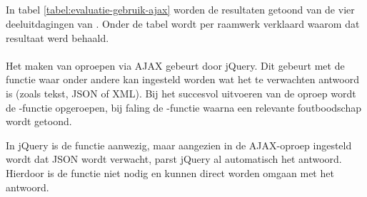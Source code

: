 
\subsection{}
\label{sec:evaluatie-gebruik-ajax}

In tabel \ref{tabel:evaluatie-gebruik-ajax} worden de resultaten getoond van de vier deeluitdagingen van .
Onder de tabel wordt per raamwerk verklaard waarom dat resultaat werd behaald.

\begin{table}[H]
\centering
{}
\caption{Gebruik van  voor \st{}~(\sta), \kendo{}~(\kendoa), \jqm{}~(\jqma) en \lungo{}~(\lungoa).}
\label{tabel:evaluatie-gebruik-ajax}
\end{table}


\paragraph{\jqm}
Het maken van oproepen via AJAX gebeurt door jQuery. 
Dit gebeurt met de functie  waar onder andere kan ingesteld worden wat het te verwachten antwoord is (zoals tekst, JSON of XML). 
Bij het succesvol uitvoeren van de oproep wordt de -functie opgeroepen, bij faling de -functie waarna een relevante foutboodschap wordt getoond.

In jQuery is de functie  aanwezig, maar aangezien in de AJAX-oproep ingesteld wordt dat JSON wordt verwacht, parst jQuery al automatisch het antwoord. 
Hierdoor is de functie  niet nodig en kunnen direct worden omgaan met het antwoord.

